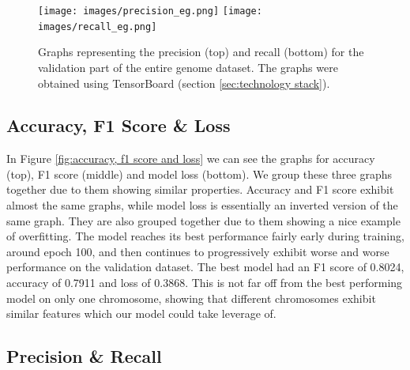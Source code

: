 \documentclass[times, utf8, diplomski, english]{fer_eng}
\begin{document}
\begin{figure}
	\centering
	\texttt{[image: images/precision\_eg.png]}
	\texttt{[image: images/recall\_eg.png]}
	\caption[Precision and recall graph]{Graphs representing the precision (top) and recall (bottom) for the validation part of the entire genome dataset. The graphs were obtained using TensorBoard (section \ref{sec:technology stack}).}
	\label{fig:precision and recall}
\end{figure}

\subsection{Accuracy, F1 Score \& Loss}

In Figure \ref{fig:accuracy, f1 score and loss} we can see the graphs for accuracy (top), F1 score (middle) and model loss (bottom). We group these three graphs together due to them showing similar properties. Accuracy and F1 score exhibit almost the same graphs, while model loss is essentially an inverted version of the same graph. They are also grouped together due to them showing a nice example of overfitting. The model reaches its best performance fairly early during training, around epoch 100, and then continues to progressively exhibit worse and worse performance on the validation dataset. The best model had an F1 score of 0.8024, accuracy of 0.7911 and loss of 0.3868. This is not far off from the best performing model on only one chromosome, showing that different chromosomes exhibit similar features which our model could take leverage of.

\subsection{Precision \& Recall}
\end{document}
